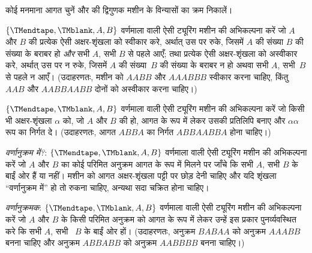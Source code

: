 \documentclass[../../../include/open-logic-section]{subfiles}
\begin{document}
\begin{prob}
कोई मनमाना आगत चुनें और  की द्विगुणक
मशीन के विन्यासों का क्रम निकालें।
\end{prob}

\begin{prob}
$\{\TMendtape,\TMblank, A, B\}$ वर्णमाला वाली ऐसी ट्यूरिंग मशीन की
अभिकल्पना करें जो $A$ और $B$ की प्रत्येक ऐसी अक्षर-शृंखला को स्वीकार
करे, अर्थात् उस पर रुके, जिसमें $A$ की संख्या $B$ की संख्या के बराबर हो
\emph{और} सभी $A$, सभी $B$ से पहले आएँ; तथा प्रत्येक ऐसी अक्षर-शृंखला
को अस्वीकार करे, अर्थात् उस पर न रुके, जिसमें $A$ की संख्या~$B$ की
संख्या के बराबर न हो अथवा सभी $A$, सभी~$B$ से पहले न आएँ। (उदाहरणतः,
मशीन को $AABB$ और $AAABBB$ स्वीकार करना चाहिए, किंतु $AAB$ और
$AABBAABB$ दोनों को अस्वीकार करना चाहिए।)
\end{prob}

\begin{prob}
$\{\TMendtape,\TMblank, A, B\}$ वर्णमाला वाली ऐसी ट्यूरिंग मशीन की
अभिकल्पना करें जो किसी भी अक्षर-शृंखला $\alpha$ को, जो $A$ और $B$ की हो, आगत के
रूप में लेकर उसकी प्रतिलिपि बनाए और $\alpha\alpha$ रूप का निर्गत दे।
(उदाहरणतः, आगत $ABBA$ का निर्गत $ABBAABBA$ होना चाहिए।)
\end{prob}

\begin{prob}
\emph{वर्णानुक्रम में?}: $\{\TMendtape,\TMblank, A, B\}$ वर्णमाला वाली
ऐसी ट्यूरिंग मशीन की अभिकल्पना करें जो $A$ और $B$ का कोई परिमित अनुक्रम
आगत के रूप में मिलने पर जाँचे कि सभी $A$, सभी $B$ के बाईं ओर हैं या
नहीं। मशीन को आगत अक्षर-शृंखला पट्टी पर छोड़ देनी चाहिए और यदि शृंखला
``वर्णानुक्रम में'' हो तो रुकना चाहिए, अन्यथा सदा चक्रित होना चाहिए।
\end{prob}

\begin{prob}
\emph{वर्णानुक्रमक}: $\{\TMendtape,\TMblank, A, B\}$ वर्णमाला वाली ऐसी
ट्यूरिंग मशीन की अभिकल्पना करें जो $A$ और $B$ के किसी परिमित अनुक्रम को
आगत के रूप में लेकर उन्हें इस प्रकार पुनर्व्यवस्थित करे कि सभी $A$, सभी
~$B$ के बाईं ओर हों। (उदाहरणतः, अनुक्रम $BABAA$ को अनुक्रम $AAABB$ बनना
चाहिए और अनुक्रम $ABBABB$ को अनुक्रम $AABBBB$ बनना चाहिए।)
\end{prob}
\end{document}
